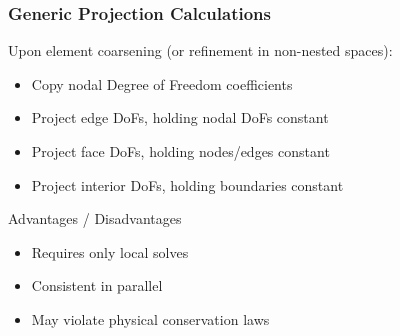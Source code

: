 \begin{frame}
\frametitle{Generic Projection Calculations}

Upon element coarsening (or refinement in non-nested spaces):

  \begin{block}{}
  \begin{itemize}
    \item{Copy nodal Degree of Freedom coefficients}
    \item{Project edge DoFs, holding nodal DoFs constant}
    \item{Project face DoFs, holding nodes/edges constant}
    \item{Project interior DoFs, holding boundaries constant}
  \end{itemize}
  \end{block}

  \begin{block}{Advantages / Disadvantages}
  \begin{itemize}
    \item{Requires only local solves}
    \item{Consistent in parallel}
    \item{May violate physical conservation laws}
  \end{itemize}
  \end{block}

\end{frame}
